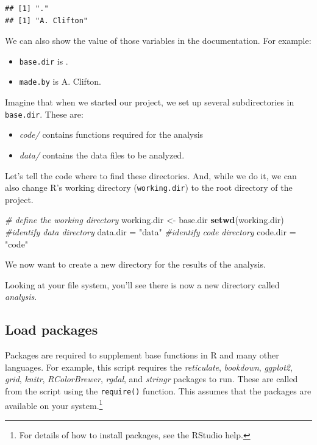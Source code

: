 \documentclass[11pt,]{article}
\newenvironment{Shaded}{\begin{snugshade}}{\end{snugshade}}
\newcommand{\CommentTok}[1]{\textcolor[rgb]{0.56,0.35,0.01}{\textit{#1}}}
\newcommand{\KeywordTok}[1]{\textcolor[rgb]{0.13,0.29,0.53}{\textbf{#1}}}
\newcommand{\NormalTok}[1]{#1}
\newcommand{\StringTok}[1]{\textcolor[rgb]{0.31,0.60,0.02}{#1}}
\providecommand{\tightlist}{%
  \setlength{\itemsep}{0pt}\setlength{\parskip}{0pt}}
\let\rmarkdownfootnote\footnote%
\def\footnote{\protect\rmarkdownfootnote}
\begin{document}
\begin{verbatim}
## [1] "."
## [1] "A. Clifton"
\end{verbatim}

We can also show the value of those variables in the documentation. For example:

\begin{itemize}
\tightlist
\item
  \texttt{base.dir} is .
\item
  \texttt{made.by} is A. Clifton.
\end{itemize}

Imagine that when we started our project, we set up several subdirectories in \texttt{base.dir}. These are:

\begin{itemize}
\tightlist
\item
  \emph{code/} contains functions required for the analysis
\item
  \emph{data/} contains the data files to be analyzed.
\end{itemize}

Let's tell the code where to find these directories. And, while we do it, we can also change R's working directory (\texttt{working.dir}) to the root directory of the project.

\begin{Shaded}
\begin{Highlighting}[]
\CommentTok{# define the working directory}
\NormalTok{working.dir <-}\StringTok{ }\NormalTok{base.dir}
\KeywordTok{setwd}\NormalTok{(working.dir)}
\CommentTok{#identify data directory}
\NormalTok{data.dir =}\StringTok{ "data"}
\CommentTok{#identify code directory}
\NormalTok{code.dir =}\StringTok{ "code"}
\end{Highlighting}
\end{Shaded}

We now want to create a new directory for the results of the analysis.

Looking at your file system, you'll see there is now a new directory called \emph{analysis}.

\hypertarget{load-packages}{%
\subsection{Load packages}\label{load-packages}}

Packages are required to supplement base functions in R and many other languages. For example, this script requires the \emph{reticulate}, \emph{bookdown}, \emph{ggplot2}, \emph{grid}, \emph{knitr}, \emph{RColorBrewer}, \emph{rgdal}, and \emph{stringr} packages to run. These are called from the script using the \texttt{require()} function. This assumes that the packages are available on your system.\footnote{For details of how to install packages, see the RStudio help.}
\end{document}
